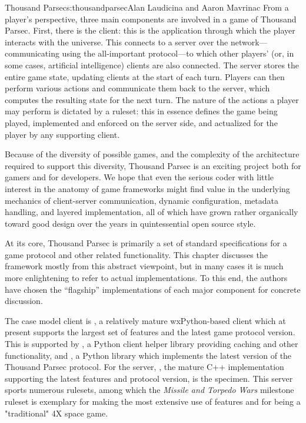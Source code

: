 \begin{aosachapter}{Thousand Parsec}{s:thousandparsec}{Alan Laudicina and Aaron Mavrinac}
From a player's perspective, three main components are involved
in a game of Thousand Parsec. First, there is the client: this is the
application through which the player interacts with the universe. This
connects to a server over the network---communicating using the
all-important protocol---to which other players' (or, in some cases,
artificial intelligence) clients are also connected. The server stores
the entire game state, updating clients at the start of each turn.
Players can then perform various actions and communicate them back to
the server, which computes the resulting state for the next turn. The
nature of the actions a player may perform is dictated by a ruleset:
this in essence defines the game being played, implemented and
enforced on the server side, and actualized for the player by any
supporting client.

Because of the diversity of possible games, and the complexity of the
architecture required to support this diversity, Thousand Parsec is an
exciting project both for gamers and for developers. We hope that even
the serious coder with little interest in the anatomy of game
frameworks might find value in the underlying mechanics of
client-server communication, dynamic configuration, metadata handling,
and layered implementation, all of which have grown rather organically
toward good design over the years in quintessential open source style.

At its core, Thousand Parsec is primarily a set of standard
specifications for a game protocol and other related
functionality. This chapter discusses the framework mostly from this
abstract viewpoint, but in many cases it is much more enlightening
to refer to actual implementations. To this end, the authors have
chosen the ``flagship'' implementations of each major component for
concrete discussion.

The case model client is , a relatively mature
wxPython-based client which at present supports the largest set of
features and the latest game protocol version. This is supported by
, a Python client helper library providing
caching and other functionality, and , a Python
library which implements the latest version of the Thousand Parsec
protocol. For the server, , the mature C++
implementation supporting the latest features and protocol version, is
the specimen. This server sports numerous rulesets, among which the
\emph{Missile and Torpedo Wars} milestone ruleset is exemplary for
making the most extensive use of features and for being a
"traditional" 4X space game.


\end{aosachapter}
